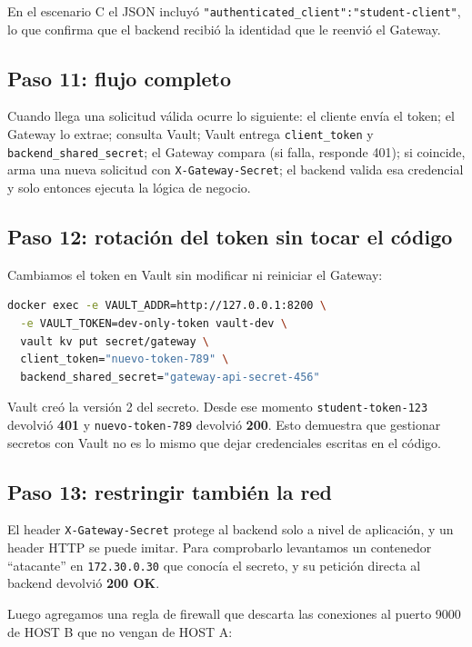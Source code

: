 \documentclass[11pt,a4paper]{article}
\begin{document}
En el escenario C el JSON incluyó \texttt{"authenticated\_client":"student-client"}, lo que confirma que el backend recibió la identidad que le reenvió el Gateway.

\subsection{Paso 11: flujo completo}

Cuando llega una solicitud válida ocurre lo siguiente: el cliente envía el token; el Gateway lo extrae; consulta Vault; Vault entrega \texttt{client\_token} y \texttt{backend\_shared\_secret}; el Gateway compara (si falla, responde 401); si coincide, arma una nueva solicitud con \texttt{X-Gateway-Secret}; el backend valida esa credencial y solo entonces ejecuta la lógica de negocio.

\subsection{Paso 12: rotación del token sin tocar el código}

Cambiamos el token en Vault sin modificar ni reiniciar el Gateway:

\begin{lstlisting}[language=bash]
docker exec -e VAULT_ADDR=http://127.0.0.1:8200 \
  -e VAULT_TOKEN=dev-only-token vault-dev \
  vault kv put secret/gateway \
  client_token="nuevo-token-789" \
  backend_shared_secret="gateway-api-secret-456"
\end{lstlisting}

Vault creó la versión 2 del secreto. Desde ese momento \texttt{student-token-123} devolvió \textbf{401} y \texttt{nuevo-token-789} devolvió \textbf{200}. Esto demuestra que gestionar secretos con Vault no es lo mismo que dejar credenciales escritas en el código.

\subsection{Paso 13: restringir también la red}

El header \texttt{X-Gateway-Secret} protege al backend solo a nivel de aplicación, y un header HTTP se puede imitar. Para comprobarlo levantamos un contenedor ``atacante'' en \texttt{172.30.0.30} que conocía el secreto, y su petición directa al backend devolvió \textbf{200 OK}.

Luego agregamos una regla de firewall que descarta las conexiones al puerto 9000 de HOST B que no vengan de HOST A:
\end{document}

